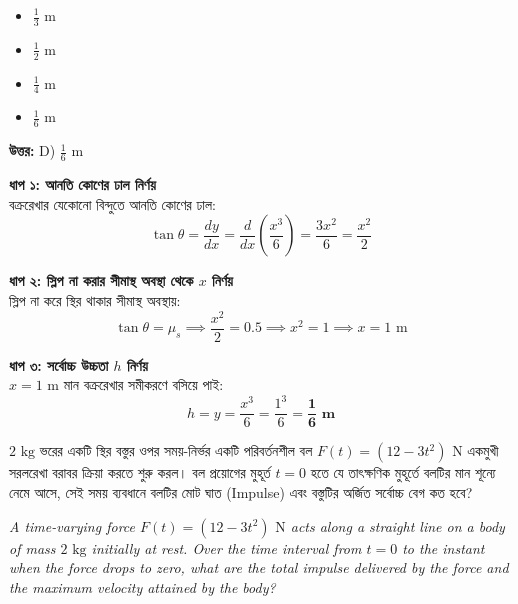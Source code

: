 \documentclass[12pt, a4paper]{article}
\begin{document}
\begin{itemize}[label={}, leftmargin=1cm, itemsep=0.5em]
\item[\textbf{A)}] $\frac{1}{3}\text{ m}$
\item[\textbf{B)}] $\frac{1}{2}\text{ m}$
\item[\textbf{C)}] $\frac{1}{4}\text{ m}$
\item[\textbf{D)}] $\frac{1}{6}\text{ m}$
\end{itemize}
\vspace{0.5em}

\begin{tcolorbox}[answerbox]
\textbf{\color{success} উত্তর:} D) $\frac{1}{6}\text{ m}$
\end{tcolorbox}
\vspace{1em}

\begin{tcolorbox}[solutionbox={সমাধান (Solution)}]
\noindent
\textbf{ধাপ ১: আনতি কোণের ঢাল নির্ণয়} \\
বক্ররেখার যেকোনো বিন্দুতে আনতি কোণের ঢাল:
\[\tan\theta = \frac{dy}{dx} = \frac{d}{dx}\left(\frac{x^3}{6}\right) = \frac{3x^2}{6} = \frac{x^2}{2}\]

\vspace{0.5em}
\noindent\textbf{ধাপ ২: স্লিপ না করার সীমাস্থ অবস্থা থেকে $x$ নির্ণয়} \\
স্লিপ না করে স্থির থাকার সীমাস্থ অবস্থায়:
\[\tan\theta = \mu_s \implies \frac{x^2}{2} = 0.5 \implies x^2 = 1 \implies x = 1\text{ m}\]

\vspace{0.5em}
\noindent\textbf{ধাপ ৩: সর্বোচ্চ উচ্চতা $h$ নির্ণয়} \\
$x = 1\text{ m}$ মান বক্ররেখার সমীকরণে বসিয়ে পাই:
\[h = y = \frac{x^3}{6} = \frac{1^3}{6} = \mathbf{\frac{1}{6}\text{ m}}\]
\end{tcolorbox}
\begin{tcolorbox}[questionbox={প্রশ্ন (Question) 37}]
\noindent
$2\text{ kg}$ ভরের একটি স্থির বস্তুর ওপর সময়-নির্ভর একটি পরিবর্তনশীল বল $F(t) = (12 - 3t^2)\text{ N}$ একমুখী সরলরেখা বরাবর ক্রিয়া করতে শুরু করল। বল প্রয়োগের মুহূর্ত $t = 0$ হতে যে তাৎক্ষণিক মুহূর্তে বলটির মান শূন্যে নেমে আসে, সেই সময় ব্যবধানে বলটির মোট ঘাত (Impulse) এবং বস্তুটির অর্জিত সর্বোচ্চ বেগ কত হবে?
\vspace{0.8em}
\begin{english}
\noindent\textit{\color{darkgray}
A time-varying force $F(t) = (12 - 3t^2)\text{ N}$ acts along a straight line on a body of mass $2\text{ kg}$ initially at rest. Over the time interval from $t = 0$ to the instant when the force drops to zero, what are the total impulse delivered by the force and the maximum velocity attained by the body?
}
\end{english}
\end{tcolorbox}
\end{document}
